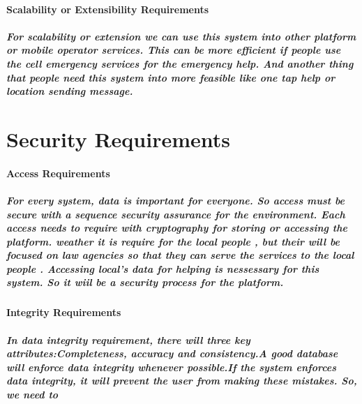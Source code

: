 \documentclass{article}
\begin{document}
\paragraph{Scalability or Extensibility Requirements}
\subparagraph{For scalability or extension we can use this system into other platform or mobile operator services. This can be more efficient if people use the cell emergency services for the emergency help. And another thing that people need this system into more feasible like one tap help or location sending message.}


\newpage
\section{Security Requirements}

\paragraph{Access Requirements}
\subparagraph{For every system, data is important for everyone. So access must be secure with a sequence security assurance for the environment.
Each access needs to require with cryptography for storing or accessing the platform. weather it is require for the local people , but their will be focused on law agencies so that they can serve the services
to the local people . Accessing local's data for helping is nessessary for this system. So it wiil be a security process for the platform.
}
\paragraph{Integrity Requirements}
\subparagraph{In data integrity requirement, there will three key attributes:Completeness, accuracy and consistency.A good database will enforce data integrity whenever possible.If the system enforces data integrity, it will prevent the user from making these mistakes.
So, we need to }
\end{document}
